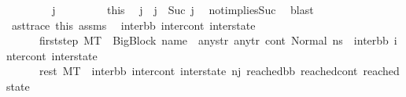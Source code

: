 \begin{isabellebody}
\ \ \isamarkupfalse%
\isanewline
\ \ \ \ \isamarkupfalse%
\ {\isachardoublequoteopen}j\ {\isasymnoteq}\ {}{\isachardoublequoteclose}\ \isanewline
\ \ \ \ \isamarkupfalse%
\ this\ \isamarkupfalse%
\ j{\isacharprime}{\kern0pt}\ \ {\isachardoublequoteopen}j\ {\isacharequal}{\kern0pt}\ Suc\ j{\isacharprime}{\kern0pt}{\isachardoublequoteclose}\ \isamarkupfalse%
\ not{}{\isacharunderscore}{\kern0pt}implies{\isacharunderscore}{\kern0pt}Suc\ \isamarkupfalse%
\ blast\isanewline
\isanewline
\ \ \ \ \isamarkupfalse%
\ ast{\isacharunderscore}{\kern0pt}trace\ this\ assms{\isacharparenleft}{\kern0pt}{}{\isacharparenright}{\kern0pt}\ \isamarkupfalse%
\ inter{\isacharunderscore}{\kern0pt}bb\ inter{\isacharunderscore}{\kern0pt}cont\ inter{\isacharunderscore}{\kern0pt}state\ \isanewline
\ \ \ \ \ \ first{\isacharunderscore}{\kern0pt}step{\isacharcolon}{\kern0pt}\ {\isachardoublequoteopen}M{\isacharcomma}{\kern0pt}{\isasymLambda}{\isacharcomma}{\kern0pt}{\isasymGamma}{\isacharcomma}{\kern0pt}{\isasymOmega}{\isacharcomma}{\kern0pt}T\ {\isasymturnstile}\ {\isasymlangle}{\isacharparenleft}{\kern0pt}{\isacharparenleft}{\kern0pt}BigBlock\ name\ {\isacharbrackleft}{\kern0pt}{\isacharbrackright}{\kern0pt}\ any{\isacharunderscore}{\kern0pt}str\ any{\isacharunderscore}{\kern0pt}tr{\isacharparenright}{\kern0pt}{\isacharcomma}{\kern0pt}\ cont{}{\isacharcomma}{\kern0pt}\ {\isacharparenleft}{\kern0pt}Normal\ ns{}{\isacharparenright}{\kern0pt}{\isacharparenright}{\kern0pt}{\isasymrangle}\ {\isasymlongrightarrow}\ {\isacharparenleft}{\kern0pt}inter{\isacharunderscore}{\kern0pt}bb{\isacharcomma}{\kern0pt}\ inter{\isacharunderscore}{\kern0pt}cont{\isacharcomma}{\kern0pt}\ inter{\isacharunderscore}{\kern0pt}state{\isacharparenright}{\kern0pt}{\isachardoublequoteclose}\ \isanewline
\ \ \ \ \ \ rest{\isacharcolon}{\kern0pt}\ {\isachardoublequoteopen}M{\isacharcomma}{\kern0pt}{\isasymLambda}{\isacharcomma}{\kern0pt}{\isasymGamma}{\isacharcomma}{\kern0pt}{\isasymOmega}{\isacharcomma}{\kern0pt}T\ {\isasymturnstile}\ {\isacharparenleft}{\kern0pt}inter{\isacharunderscore}{\kern0pt}bb{\isacharcomma}{\kern0pt}\ inter{\isacharunderscore}{\kern0pt}cont{\isacharcomma}{\kern0pt}\ inter{\isacharunderscore}{\kern0pt}state{\isacharparenright}{\kern0pt}\ {\isacharminus}{\kern0pt}n{\isasymlongrightarrow}{\isacharcircum}{\kern0pt}j{\isacharprime}{\kern0pt}\ {\isacharparenleft}{\kern0pt}reached{\isacharunderscore}{\kern0pt}bb{\isacharcomma}{\kern0pt}\ reached{\isacharunderscore}{\kern0pt}cont{\isacharcomma}{\kern0pt}\ reached{\isacharunderscore}{\kern0pt}state{\isacharparenright}{\kern0pt}{\isachardoublequoteclose}\isanewline

\end{isabellebody}
